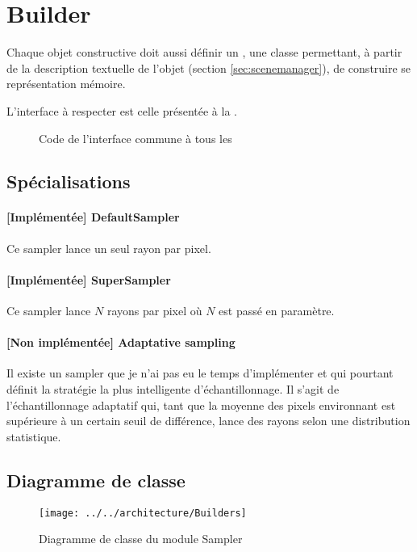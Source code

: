 \section{Builder}
Chaque objet constructive doit aussi définir un , \ie une classe
permettant, à partir de la description textuelle de l'objet (\cf section
\ref{sec:scenemanager}), de construire se représentation mémoire.

L'interface à respecter est celle présentée à la .

\begin{figure}[h]
  \caption{Code de l'interface commune à tous les
  \label{fig:IBuilders}}
\end{figure}


\subsection{Spécialisations}
\paragraph{[Implémentée] DefaultSampler} Ce sampler lance un seul rayon par pixel.

\paragraph{[Implémentée] SuperSampler} Ce sampler lance $N$ rayons par pixel où $N$ est
passé en paramètre.

\paragraph{[Non implémentée] Adaptative sampling} Il existe un sampler que je
n'ai pas eu le temps d'implémenter et qui pourtant définit la stratégie la
plus intelligente d'échantillonnage. Il s'agit de l'échantillonnage adaptatif
qui, tant que la moyenne des pixels environnant est supérieure à un certain
seuil de différence, lance des rayons selon une distribution statistique.

\subsection{Diagramme de classe}
\begin{figure}[h]
\begin{center}
  \texttt{[image: ../../architecture/Builders]}
  \caption{Diagramme de classe du module Sampler\label{fig:CDBuilders}}
\end{center}
\end{figure}
